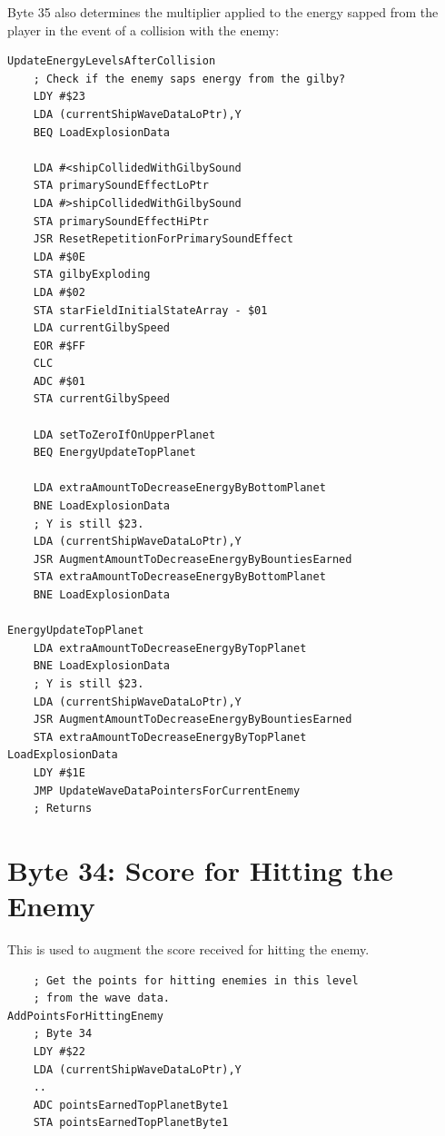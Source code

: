 Byte 35 also determines the multiplier applied to the energy sapped from the player in the 
event of a collision with the enemy:

\begin{lstlisting}
UpdateEnergyLevelsAfterCollision
    ; Check if the enemy saps energy from the gilby?
    LDY #$23
    LDA (currentShipWaveDataLoPtr),Y
    BEQ LoadExplosionData

    LDA #<shipCollidedWithGilbySound
    STA primarySoundEffectLoPtr
    LDA #>shipCollidedWithGilbySound
    STA primarySoundEffectHiPtr
    JSR ResetRepetitionForPrimarySoundEffect
    LDA #$0E
    STA gilbyExploding
    LDA #$02
    STA starFieldInitialStateArray - $01
    LDA currentGilbySpeed
    EOR #$FF
    CLC
    ADC #$01
    STA currentGilbySpeed

    LDA setToZeroIfOnUpperPlanet
    BEQ EnergyUpdateTopPlanet

    LDA extraAmountToDecreaseEnergyByBottomPlanet
    BNE LoadExplosionData
    ; Y is still $23.
    LDA (currentShipWaveDataLoPtr),Y
    JSR AugmentAmountToDecreaseEnergyByBountiesEarned
    STA extraAmountToDecreaseEnergyByBottomPlanet
    BNE LoadExplosionData

EnergyUpdateTopPlanet   
    LDA extraAmountToDecreaseEnergyByTopPlanet
    BNE LoadExplosionData
    ; Y is still $23.
    LDA (currentShipWaveDataLoPtr),Y
    JSR AugmentAmountToDecreaseEnergyByBountiesEarned
    STA extraAmountToDecreaseEnergyByTopPlanet
LoadExplosionData
    LDY #$1E
    JMP UpdateWaveDataPointersForCurrentEnemy
    ; Returns

\end{lstlisting}

\section{Byte 34: Score for Hitting the Enemy}
This is used to augment the score received for hitting the enemy.
\begin{lstlisting}
    ; Get the points for hitting enemies in this level
    ; from the wave data.
AddPointsForHittingEnemy   
    ; Byte 34
    LDY #$22
    LDA (currentShipWaveDataLoPtr),Y
    ..
    ADC pointsEarnedTopPlanetByte1
    STA pointsEarnedTopPlanetByte1
\end{lstlisting}

